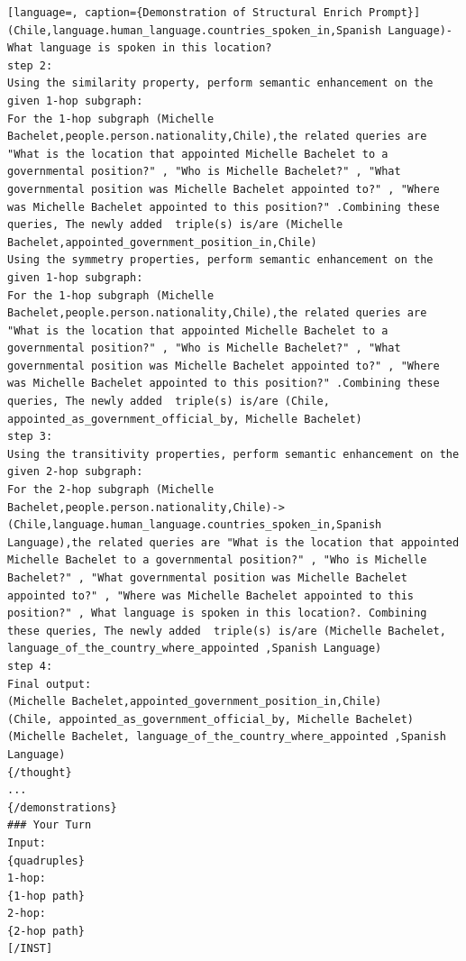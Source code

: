 \documentclass[11pt]{article}
\begin{document}
\begin{lstlisting}[language=, caption={Demonstration of Structural Enrich Prompt}]
(Chile,language.human_language.countries_spoken_in,Spanish Language)-What language is spoken in this location?
step 2:
Using the similarity property, perform semantic enhancement on the given 1-hop subgraph:
For the 1-hop subgraph (Michelle Bachelet,people.person.nationality,Chile),the related queries are "What is the location that appointed Michelle Bachelet to a governmental position?" , "Who is Michelle Bachelet?" , "What governmental position was Michelle Bachelet appointed to?" , "Where was Michelle Bachelet appointed to this position?" .Combining these queries, The newly added  triple(s) is/are (Michelle Bachelet,appointed_government_position_in,Chile)
Using the symmetry properties, perform semantic enhancement on the given 1-hop subgraph:
For the 1-hop subgraph (Michelle Bachelet,people.person.nationality,Chile),the related queries are "What is the location that appointed Michelle Bachelet to a governmental position?" , "Who is Michelle Bachelet?" , "What governmental position was Michelle Bachelet appointed to?" , "Where was Michelle Bachelet appointed to this position?" .Combining these queries, The newly added  triple(s) is/are (Chile, appointed_as_government_official_by, Michelle Bachelet)
step 3:
Using the transitivity properties, perform semantic enhancement on the given 2-hop subgraph:
For the 2-hop subgraph (Michelle Bachelet,people.person.nationality,Chile)->(Chile,language.human_language.countries_spoken_in,Spanish Language),the related queries are "What is the location that appointed Michelle Bachelet to a governmental position?" , "Who is Michelle Bachelet?" , "What governmental position was Michelle Bachelet appointed to?" , "Where was Michelle Bachelet appointed to this position?" , What language is spoken in this location?. Combining these queries, The newly added  triple(s) is/are (Michelle Bachelet, language_of_the_country_where_appointed ,Spanish Language)
step 4:
Final output:
(Michelle Bachelet,appointed_government_position_in,Chile)
(Chile, appointed_as_government_official_by, Michelle Bachelet)
(Michelle Bachelet, language_of_the_country_where_appointed ,Spanish Language)
{/thought}
...
{/demonstrations}
### Your Turn
Input:
{quadruples}
1-hop:
{1-hop path}
2-hop:
{2-hop path}
[/INST]
\end{lstlisting}
\label{Structural Enrich Prompt}
\end{document}
